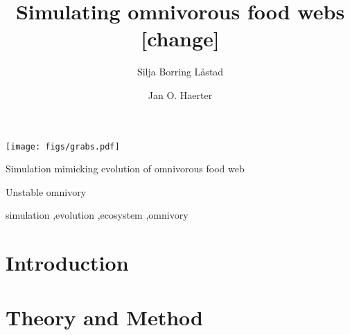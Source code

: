 \documentclass[a4paper,fleqn]{cas-dc}
\begin{document}
\let\WriteBookmarks\relax
\def\floatpagepagefraction{1}
\def\textpagefraction{.001}

\title [mode = title]{Simulating omnivorous food webs [change]}     


\author[1]{Silja Borring L\aa stad}


\address[1]{Niels Bohr Institute, University of Copenhagen, Blegdamsvej 17, 2100 Copenhagen, Denmark}

\author[1]{Jan O. Haerter}


\begin{abstract}

\newline
\newline
\newline
\newline
\end{abstract}

\begin{graphicalabstract}
\texttt{[image: figs/grabs.pdf]}
\end{graphicalabstract}

\begin{highlights}
\item Simulation mimicking evolution of omnivorous food web
\item Unstable omnivory
\end{highlights}

\begin{keywords}
simulation \sep evolution \sep ecosystem \sep omnivory
\end{keywords}


\maketitle

\section{Introduction}


\section{Theory and Method} %

\end{document}
